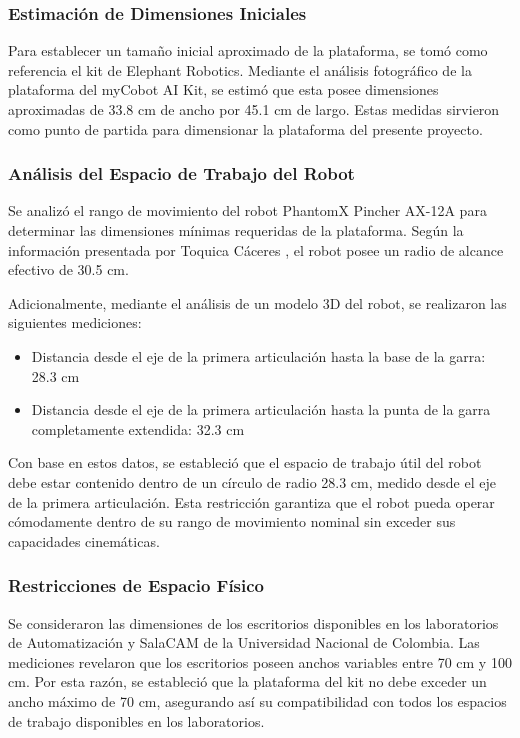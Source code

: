 \subsubsection{Estimación de Dimensiones Iniciales}

Para establecer un tamaño inicial aproximado de la plataforma, se tomó como referencia el kit de Elephant Robotics. Mediante el análisis fotográfico de la plataforma del myCobot AI Kit, se estimó que esta posee dimensiones aproximadas de 33.8 cm de ancho por 45.1 cm de largo. Estas medidas sirvieron como punto de partida para dimensionar la plataforma del presente proyecto.

\subsubsection{Análisis del Espacio de Trabajo del Robot}

Se analizó el rango de movimiento del robot PhantomX Pincher AX-12A para determinar las dimensiones mínimas requeridas de la plataforma. Según la información presentada por Toquica Cáceres \cite{Toquica2018}, el robot posee un radio de alcance efectivo de 30.5 cm.

Adicionalmente, mediante el análisis de un modelo 3D del robot, se realizaron las siguientes mediciones:
\begin{itemize}
    \item Distancia desde el eje de la primera articulación hasta la base de la garra: 28.3 cm
    \item Distancia desde el eje de la primera articulación hasta la punta de la garra completamente extendida: 32.3 cm
\end{itemize}

Con base en estos datos, se estableció que el espacio de trabajo útil del robot debe estar contenido dentro de un círculo de radio 28.3 cm, medido desde el eje de la primera articulación. Esta restricción garantiza que el robot pueda operar cómodamente dentro de su rango de movimiento nominal sin exceder sus capacidades cinemáticas.

\subsubsection{Restricciones de Espacio Físico}

Se consideraron las dimensiones de los escritorios disponibles en los laboratorios de Automatización y SalaCAM de la Universidad Nacional de Colombia. Las mediciones revelaron que los escritorios poseen anchos variables entre 70 cm y 100 cm. Por esta razón, se estableció que la plataforma del kit no debe exceder un ancho máximo de 70 cm, asegurando así su compatibilidad con todos los espacios de trabajo disponibles en los laboratorios.

